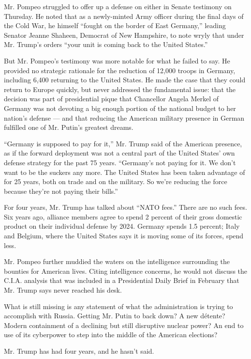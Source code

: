 Mr. Pompeo struggled to offer up a defense on either in Senate testimony
on Thursday. He noted that as a newly-minted Army officer during the
final days of the Cold War, he himself ``fought on the border of East
Germany,'' leading Senator Jeanne Shaheen, Democrat of New Hampshire, to
note wryly that under Mr. Trump's orders ``your unit is coming back to
the United States.''

But Mr. Pompeo's testimony was more notable for what he failed to say.
He provided no strategic rationale for the reduction of 12,000 troops in
Germany, including 6,400 returning to the United States. He made the
case that they could return to Europe quickly, but never addressed the
fundamental issue: that the decision was part of presidential pique that
Chancellor Angela Merkel of Germany was not devoting a big enough
portion of the national budget to her nation's defense --- and that
reducing the American military presence in German fulfilled one of Mr.
Putin's greatest dreams.

``Germany is supposed to pay for it,'' Mr. Trump said of the American
presence, as if the forward deployment was not a central part of the
United States' own defense strategy for the past 75 years. ``Germany's
not paying for it. We don't want to be the suckers any more. The United
States has been taken advantage of for 25 years, both on trade and on
the military. So we're reducing the force because they're not paying
their bills.''

For four years, Mr. Trump has talked about ``NATO fees.'' There are no
such fees. Six years ago, alliance members agree to spend 2 percent of
their gross domestic product on their individual defense by 2024.
Germany spends 1.5 percent; Italy and Belgium, where the United States
says it is moving some of its forces, spend less.

Mr. Pompeo further muddied the waters on the intelligence surrounding
the bounties for American lives. Citing intelligence concerns, he would
not discuss the C.I.A. analysis that was included in a Presidential
Daily Brief in February that Mr. Trump says never reached his desk.

What is still missing is any statement of what the administration is
trying to accomplish with Russia. Getting Mr. Putin to back down? A new
détente? Modern containment of a declining but still disruptive nuclear
power? An end to use of its cyberpower to step into the middle of the
American elections?

Mr. Trump has had four years, and he hasn't said.


